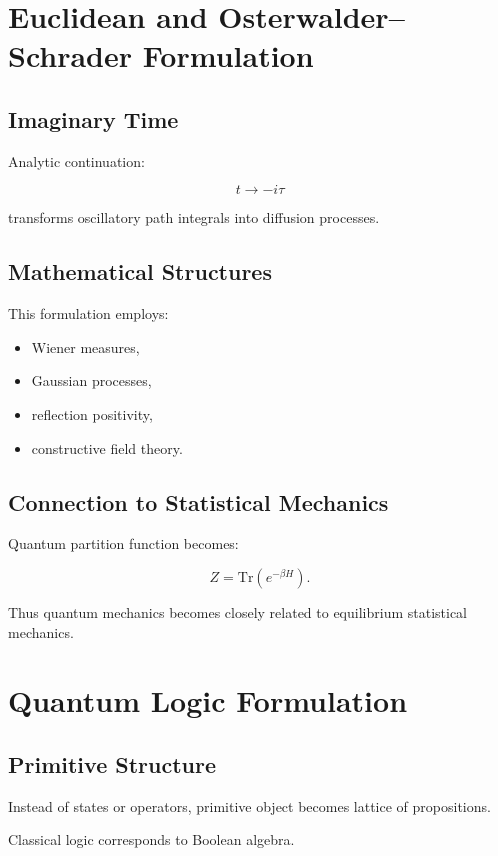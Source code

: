 \documentclass[11pt]{article}
\begin{document}
\section{Euclidean and Osterwalder--Schrader Formulation}

\subsection{Imaginary Time}

Analytic continuation:

\[
t
\rightarrow
-i\tau
\]

transforms oscillatory path integrals into diffusion processes.

\subsection{Mathematical Structures}

This formulation employs:

\begin{itemize}
\item Wiener measures,
\item Gaussian processes,
\item reflection positivity,
\item constructive field theory.
\end{itemize}

\subsection{Connection to Statistical Mechanics}

Quantum partition function becomes:

\[
Z
=
\mathrm{Tr}
(e^{-\beta H}).
\]

Thus quantum mechanics becomes closely related to equilibrium statistical mechanics.

\section{Quantum Logic Formulation}

\subsection{Primitive Structure}

Instead of states or operators, primitive object becomes lattice of propositions.

Classical logic corresponds to Boolean algebra.
\end{document}
